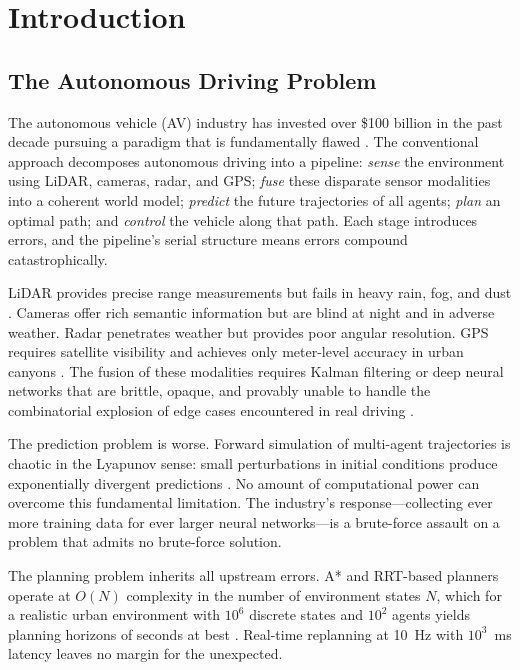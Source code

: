 \documentclass[twocolumn,10pt]{article}
\theoremstyle{definition}
\theoremstyle{remark}
\begin{document}
\section{Introduction}
\label{sec:introduction}

\subsection{The Autonomous Driving Problem}

The autonomous vehicle (AV) industry has invested over \$100 billion in the past decade pursuing a paradigm that is fundamentally flawed \cite{thrun2006stanley, schwarting2018planning, bojarski2016end}. The conventional approach decomposes autonomous driving into a pipeline: \emph{sense} the environment using LiDAR, cameras, radar, and GPS; \emph{fuse} these disparate sensor modalities into a coherent world model; \emph{predict} the future trajectories of all agents; \emph{plan} an optimal path; and \emph{control} the vehicle along that path. Each stage introduces errors, and the pipeline's serial structure means errors compound catastrophically.

LiDAR provides precise range measurements but fails in heavy rain, fog, and dust \cite{kaplan2017understanding}. Cameras offer rich semantic information but are blind at night and in adverse weather. Radar penetrates weather but provides poor angular resolution. GPS requires satellite visibility and achieves only meter-level accuracy in urban canyons \cite{kaplan2017understanding}. The fusion of these modalities requires Kalman filtering or deep neural networks that are brittle, opaque, and provably unable to handle the combinatorial explosion of edge cases encountered in real driving \cite{schwarting2018planning}.

The prediction problem is worse. Forward simulation of multi-agent trajectories is chaotic in the Lyapunov sense: small perturbations in initial conditions produce exponentially divergent predictions \cite{helbing2001traffic}. No amount of computational power can overcome this fundamental limitation. The industry's response---collecting ever more training data for ever larger neural networks---is a brute-force assault on a problem that admits no brute-force solution.

The planning problem inherits all upstream errors. A* and RRT-based planners operate at $O(N)$ complexity in the number of environment states $N$, which for a realistic urban environment with $10^6$ discrete states and $10^2$ agents yields planning horizons of seconds at best \cite{urmson2008autonomous}. Real-time replanning at \SI{10}{Hz} with $10^3$~ms latency leaves no margin for the unexpected.
\end{document}
